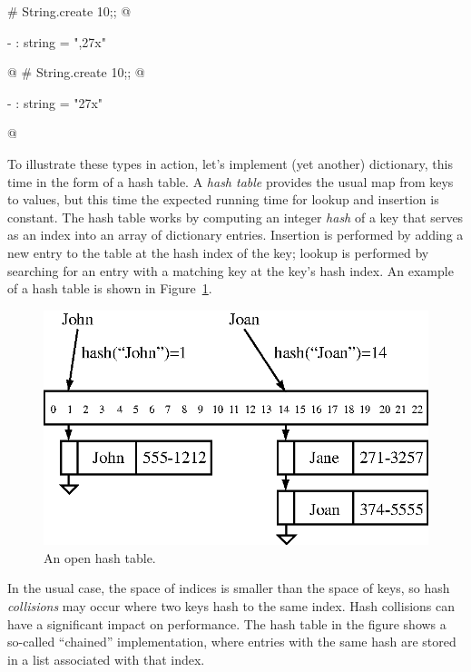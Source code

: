 \begin{ocaml}
# String.create 10;;
@
\begin{topoutput}
- : string = ",\027x"
\end{topoutput}
@
# String.create 10;;
@
\begin{topoutput}
- : string = "\027x"
\end{topoutput}
@
\end{ocaml}


To illustrate these types in action, let's implement (yet another)
dictionary, this time in the form of a hash table.  A \emph{hash
table} provides the usual map from keys to values, but this time the
expected running time for lookup and insertion is constant.  The hash table
works by computing an integer \emph{hash} of a key that serves as an
index into an array of dictionary entries.  Insertion is performed by
adding a new entry to the table at the hash index of the key; lookup
is performed by searching for an entry with a matching key at the
key's hash index.  An example of a hash table is shown in
Figure~\ref{figure:hash-table}.

\begin{figure}
\centerline{\includegraphics{hash}}
\caption{An open hash table.}
\label{figure:hash-table}
\end{figure}

In the usual case, the space of indices is smaller than the space of
keys, so hash \emph{collisions} may occur where two keys hash to the
same index.  Hash collisions can have a significant impact on
performance.  The hash table in the figure shows a so-called
``chained'' implementation, where entries with the same hash are
stored in a list associated with that index.

